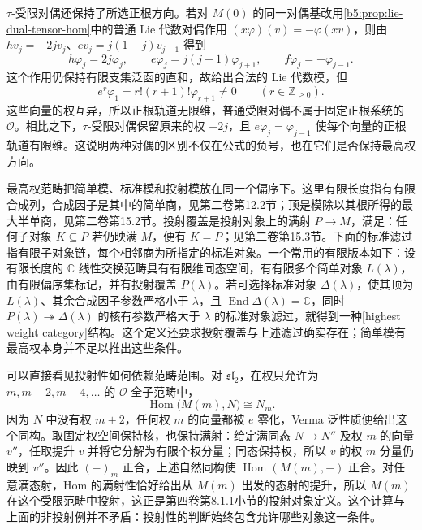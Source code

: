 \ProseParagraphBreak

\(\tau\)-受限对偶还保持了所选正根方向。若对 \(M(0)\) 的同一对偶基改用\cref{b5:prop:lie-dual-tensor-hom}中的普通 Lie 代数对偶作用 \((x\varphi)(v)=-\varphi(xv)\)，则由 \(hv_j=-2jv_j\)、\(ev_j=j(1-j)v_{j-1}\) 得到
\[
	h\varphi_j=2j\varphi_j,\qquad e\varphi_j=j(j+1)\varphi_{j+1},\qquad f\varphi_j=-\varphi_{j-1}.
\]
这个作用仍保持有限支集泛函的直和，故给出合法的 Lie 代数模，但
\[
	e^r\varphi_1=r!(r+1)!\varphi_{r+1}\ne0 \qquad(r\in\mathbb Z_{\ge0}).
\]
这些向量的权互异，所以正根轨道无限维，普通受限对偶不属于固定正根系统的 \(\mathcal O\)。相比之下，\(\tau\)-受限对偶保留原来的权 \(-2j\)，且 \(e\varphi_j=\varphi_{j-1}\) 使每个向量的正根轨道有限维。这说明两种对偶的区别不仅在公式的负号，也在它们是否保持最高权方向。

\ProseParagraphBreak

最高权范畴把简单模、标准模和投射模放在同一个偏序下。这里有限长度指有有限合成列，合成因子是其中的简单商，见第二卷第12.2节；顶是模除以其根所得的最大半单商，见第二卷第15.2节。投射覆盖是投射对象上的满射 \(P\to M\)，满足：任何子对象 \(K\subseteq P\) 若仍映满 \(M\)，便有 \(K=P\)；见第二卷第15.3节。下面的标准滤过指有限子对象链，每个相邻商为所指定的标准对象。一个常用的有限版本如下：设有限长度的 \(\mathbb C\) 线性交换范畴具有有限维同态空间，有有限多个简单对象 \(L(\lambda)\)，由有限偏序集标记，并有投射覆盖 \(P(\lambda)\)。若可选择标准对象 \(\Delta(\lambda)\)，使其顶为 \(L(\lambda)\)、其余合成因子参数严格小于 \(\lambda\)，且 \(\operatorname{End}\Delta(\lambda)=\mathbb C\)，同时 \(P(\lambda)\twoheadrightarrow\Delta(\lambda)\) 的核有参数严格大于 \(\lambda\) 的标准对象滤过，就得到一种[highest weight category]结构。这个定义还要求投射覆盖与上述滤过确实存在；简单模有最高权本身并不足以推出这些条件。

\ProseParagraphBreak
可以直接看见投射性如何依赖范畴范围。对 \(\mathfrak{sl}_2\)，在权只允许为 \(m,m-2,m-4,\ldots\) 的 \(\mathcal O\) 全子范畴中，
\[
	\operatorname{Hom}\bigl(M(m),N\bigr)\cong N_m.
\]
因为 \(N\) 中没有权 \(m+2\)，任何权 \(m\) 的向量都被 \(e\) 零化，Verma 泛性质便给出这个同构。取固定权空间保持核，也保持满射：给定满同态 \(N\to N''\) 及权 \(m\) 的向量 \(v''\)，任取提升 \(v\) 并将它分解为有限个权分量；同态保持权，所以 \(v\) 的权 \(m\) 分量仍映到 \(v''\)。因此 \((-)_m\) 正合，上述自然同构使 \(\operatorname{Hom}(M(m),-)\) 正合。对任意满态射，Hom 的满射性恰好给出从 \(M(m)\) 出发的态射的提升，所以 \(M(m)\) 在这个受限范畴中投射，这正是第四卷第8.1.1小节的投射对象定义。这个计算与上面的非投射例并不矛盾：投射性的判断始终包含允许哪些对象这一条件。


